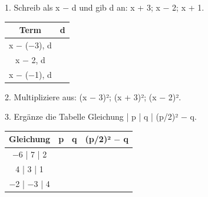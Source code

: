 \documentclass[11pt]{article}
\begin{document}
\pfheftstil
{}
\pfrueckblick
\begin{pfaufg}{}{1.}{}
Schreib als x $-$ d und gib d an: x + 3; x $-$ 2; x + 1.
\par\smallskip\noindent \begingroup\renewcommand{\arraystretch}{1.3}\begin{tabular}{|c|c|}\hline \textbf{Term} & \textbf{d} \\ \hline x $-$ ($-$3), d & \rule{0pt}{3ex}\hspace{1.6cm} \\ \hline x $-$ 2, d & \rule{0pt}{3ex}\hspace{1.6cm} \\ \hline x $-$ ($-$1), d & \rule{0pt}{3ex}\hspace{1.6cm} \\ \hline\end{tabular}\endgroup\par
{}
\end{pfaufg}
\begin{pfaufg}{}{2.}{}
Multipliziere aus: (x $-$ 3)²; (x + 3)²; (x $-$ 2)².
\end{pfaufg}
\begin{pfaufg}{}{3.}{}
Ergänze die Tabelle Gleichung | p | q | (p/2)² $-$ q.
\par\smallskip\noindent \begingroup\renewcommand{\arraystretch}{1.3}\begin{tabular}{|c|c|c|c|}\hline \textbf{Gleichung} & \textbf{p} & \textbf{q} & \textbf{(p/2)² $-$ q} \\ \hline $-$6 | 7 | 2 & \rule{0pt}{3ex}\hspace{1.6cm} & \rule{0pt}{3ex}\hspace{1.6cm} & \rule{0pt}{3ex}\hspace{1.6cm} \\ \hline 4 | 3 | 1 & \rule{0pt}{3ex}\hspace{1.6cm} & \rule{0pt}{3ex}\hspace{1.6cm} & \rule{0pt}{3ex}\hspace{1.6cm} \\ \hline $-$2 | $-$3 | 4 & \rule{0pt}{3ex}\hspace{1.6cm} & \rule{0pt}{3ex}\hspace{1.6cm} & \rule{0pt}{3ex}\hspace{1.6cm} \\ \hline\end{tabular}\endgroup\par
{}
\end{pfaufg}
\end{document}
